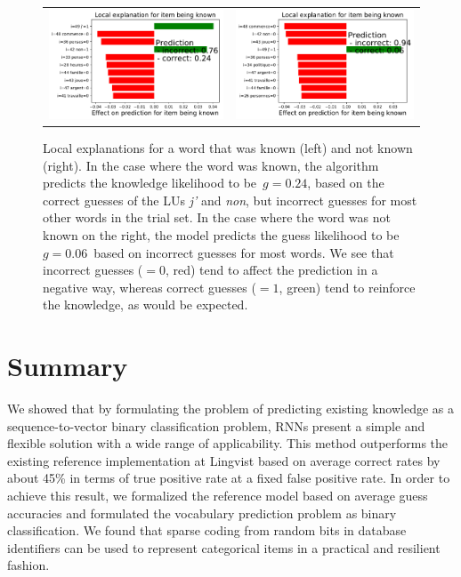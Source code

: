 \begin{figure}[ht]
\label{fig:lime}
\centering
\begin{tabular}{cc}
\includegraphics[width=0.4\linewidth]{figures/lingvist/lime_pos.pdf} &
\includegraphics[width=0.4\linewidth]{figures/lingvist/lime_neg.pdf} \\
\end{tabular}
\caption[Local explanations of the model prediction]{Local explanations for a word that was known (left) and not known (right). In the case where the word was known, the algorithm predicts the knowledge likelihood to be~$g = 0.24$, based on the correct guesses of the LUs \textit{j'} and \textit{non}, but incorrect guesses for most other words in the trial set. In the case where the word was not known on the right, the model predicts the guess likelihood to be~$g = 0.06$~based on incorrect guesses for most words. We see that incorrect guesses ($=0$, red) tend to affect the prediction in a negative way, whereas correct guesses ($=1$, green) tend to reinforce the knowledge, as would be expected.}
\end{figure}


\section{Summary}
\label{sec:lingvist_summary}
We showed that by formulating the problem of predicting existing knowledge as a sequence-to-vector binary classification problem, RNNs present a simple and flexible solution with a wide range of applicability. This method outperforms the existing reference implementation at Lingvist based on average correct rates by about 45\% in terms of true positive rate at a fixed false positive rate. In order to achieve this result, we formalized the reference model based on average guess accuracies and formulated the vocabulary prediction problem as binary classification. We found that sparse coding from random bits in database identifiers can be used to represent categorical items in a practical and resilient fashion.

